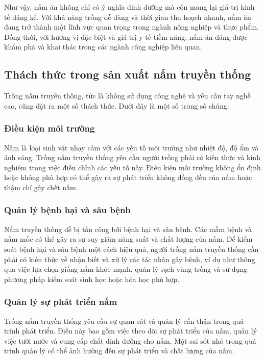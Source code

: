 Như vậy, nấm ăn không chỉ có ý nghĩa dinh dưỡng mà còn mang lại giá trị kinh tế đáng kể. Với khả năng trồng dễ dàng và thời gian thu hoạch nhanh, nấm ăn đang trở thành một lĩnh vực quan trọng trong ngành nông nghiệp và thực phẩm. Đồng thời, với hương vị đặc biệt và giá trị y tế tiềm năng, nấm ăn đáng được khám phá và khai thác trong các ngành công nghiệp liên quan.

\subsection{Thách thức trong sản xuất nấm truyền thống}

Trồng nấm truyền thống, tức là không sử dụng công nghệ và yêu cầu tay nghề cao, cũng đặt ra một số thách thức. Dưới đây là một số trong số chúng:

\subsubsection{Điều kiện môi trường}
Nấm là loại sinh vật nhạy cảm với các yếu tố môi trường như nhiệt độ, độ ẩm và ánh sáng. Trồng nấm truyền thống yêu cầu người trồng phải có kiến thức và kinh nghiệm trong việc điều chỉnh các yếu tố này. Điều kiện môi trường không ổn định hoặc không phù hợp có thể gây ra sự phát triển không đồng đều của nấm hoặc thậm chí gây chết nấm.

\subsubsection{Quản lý bệnh hại và sâu bệnh}
Nấm truyền thống dễ bị tấn công bởi bệnh hại và sâu bệnh. Các mầm bệnh và nấm mốc có thể gây ra sự suy giảm năng suất và chất lượng của nấm. Để kiểm soát bệnh hại và sâu bệnh một cách hiệu quả, người trồng nấm truyền thống cần phải có kiến thức về nhận biết và xử lý các tác nhân gây bệnh, ví dụ như thông qua việc lựa chọn giống nấm khỏe mạnh, quản lý sạch vùng trồng và sử dụng phương pháp kiểm soát sinh học hoặc hóa học phù hợp.

\subsubsection{Quản lý sự phát triển nấm}
Trồng nấm truyền thống yêu cầu sự quan sát và quản lý cẩn thận trong quá trình phát triển. Điều này bao gồm việc theo dõi sự phát triển của nấm, quản lý việc tưới nước và cung cấp chất dinh dưỡng cho nấm. Một sai sót nhỏ trong quá trình quản lý có thể ảnh hưởng đến sự phát triển và chất lượng của nấm.


